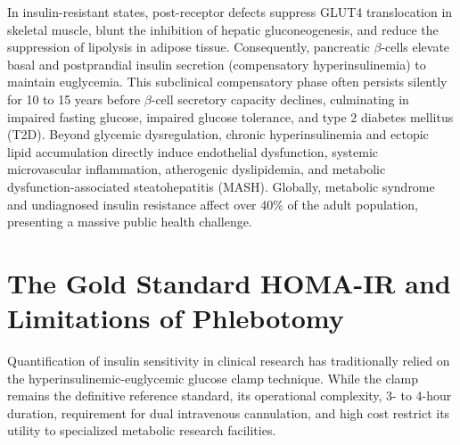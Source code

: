 \documentclass[12pt,a4paper,oneside]{report}
\begin{document}
In insulin-resistant states, post-receptor defects suppress GLUT4 translocation in skeletal muscle, blunt the inhibition of hepatic gluconeogenesis, and reduce the suppression of lipolysis in adipose tissue. Consequently, pancreatic $\beta$-cells elevate basal and postprandial insulin secretion (compensatory hyperinsulinemia) to maintain euglycemia. This subclinical compensatory phase often persists silently for 10 to 15 years before $\beta$-cell secretory capacity declines, culminating in impaired fasting glucose, impaired glucose tolerance, and type 2 diabetes mellitus (T2D). Beyond glycemic dysregulation, chronic hyperinsulinemia and ectopic lipid accumulation directly induce endothelial dysfunction, systemic microvascular inflammation, atherogenic dyslipidemia, and metabolic dysfunction-associated steatohepatitis (MASH). Globally, metabolic syndrome and undiagnosed insulin resistance affect over 40\% of the adult population, presenting a massive public health challenge.

\section{The Gold Standard HOMA-IR and Limitations of Phlebotomy}
Quantification of insulin sensitivity in clinical research has traditionally relied on the hyperinsulinemic-euglycemic glucose clamp technique. While the clamp remains the definitive reference standard, its operational complexity, 3- to 4-hour duration, requirement for dual intravenous cannulation, and high cost restrict its utility to specialized metabolic research facilities.
\end{document}
